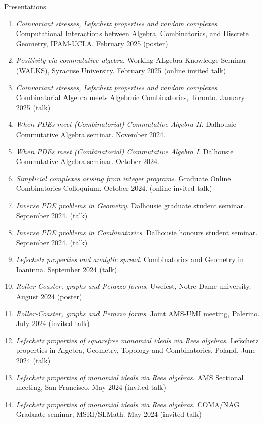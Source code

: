 \documentclass[12pt]{resume} %
\begin{document}
\begin{rSection}{Presentations}
    \begin{enumerate}
        \item \textit{Coinvariant stresses, Lefschetz properties and random complexes}. Computational Interactions between Algebra, Combinatorics, and Discrete Geometry, IPAM-UCLA. February 2025 (poster)
        \item \textit{Positivity via commutative algebra}. Working ALgebra Knowledge Seminar (WALKS), Syracuse University. February 2025 (online invited talk)
        \item \textit{Coinvariant stresses, Lefschetz properties and random complexes}. Combinatorial Algebra meets Algebraic Combinatorics, Toronto. January 2025 (talk)
        \item \textit{When PDEs meet (Combinatorial) Commutative Algebra II}. Dalhousie Commutative Algebra seminar. November 2024.
        \item \textit{When PDEs meet (Combinatorial) Commutative Algebra I}. Dalhousie Commutative Algebra seminar. October 2024.
        \item \textit{Simplicial complexes arising from integer programs}. Graduate Online Combinatorics Colloquium. October 2024. (online invited talk)
        \item \textit{Inverse PDE problems in Geometry}. Dalhousie graduate student seminar. September 2024. (talk)
        \item \textit{Inverse PDE problems in Combinatorics}. Dalhousie honours student seminar. September 2024. (talk)
        \item \textit{Lefschetz properties and analytic spread}. Combinatorics and Geometry in Ioaninna. September 2024 (talk)
        \item \textit{Roller-Coaster, graphs and Perazzo forms}. Uwefest, Notre Dame university. August 2024 (poster)
        \item \textit{Roller-Coaster, graphs and Perazzo forms}. Joint AMS-UMI meeting, Palermo. July 2024 (invited talk)
        \item \textit{Lefschetz properties of squarefree monomial ideals via Rees algebras}. Lefschetz properties in Algebra, Geometry, Topology and Combinatorics, Poland. June 2024 (talk) 
        \item \textit{Lefschetz properties of monomial ideals via Rees algebras}. AMS Sectional meeting, San Francisco. May 2024 (invited talk) 
        \item \textit{Lefschetz properties of monomial ideals via Rees algebras}. COMA/NAG Graduate seminar, \newline MSRI/SLMath. May 2024 (invited talk) 

\end{enumerate}
\end{rSection}
\end{document}
